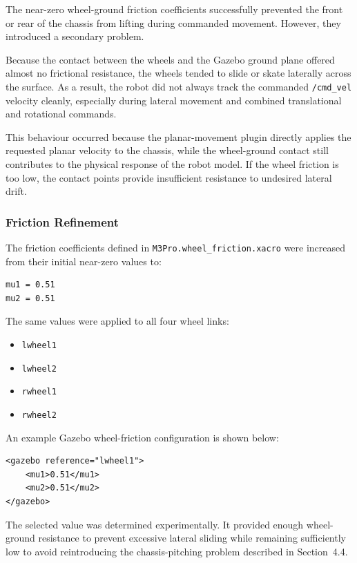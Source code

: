 \documentclass{article}
\begin{document}
The near-zero wheel-ground friction coefficients successfully prevented the front or rear of the chassis from lifting during commanded movement. However, they introduced a secondary problem.

Because the contact between the wheels and the Gazebo ground plane offered almost no frictional resistance, the wheels tended to slide or skate laterally across the surface. As a result, the robot did not always track the commanded \texttt{/cmd\_vel} velocity cleanly, especially during lateral movement and combined translational and rotational commands.

This behaviour occurred because the planar-movement plugin directly applies the requested planar velocity to the chassis, while the wheel-ground contact still contributes to the physical response of the robot model. If the wheel friction is too low, the contact points provide insufficient resistance to undesired lateral drift.

\subsubsection{Friction Refinement}

The friction coefficients defined in \texttt{M3Pro.wheel\_friction.xacro} were increased from their initial near-zero values to:

\begin{verbatim}
mu1 = 0.51
mu2 = 0.51
\end{verbatim}

The same values were applied to all four wheel links:

\begin{itemize}
    \item \texttt{lwheel1}
    \item \texttt{lwheel2}
    \item \texttt{rwheel1}
    \item \texttt{rwheel2}
\end{itemize}

An example Gazebo wheel-friction configuration is shown below:

\begin{verbatim}
<gazebo reference="lwheel1">
    <mu1>0.51</mu1>
    <mu2>0.51</mu2>
</gazebo>
\end{verbatim}

The selected value was determined experimentally. It provided enough wheel-ground resistance to prevent excessive lateral sliding while remaining sufficiently low to avoid reintroducing the chassis-pitching problem described in Section~4.4.
\end{document}
